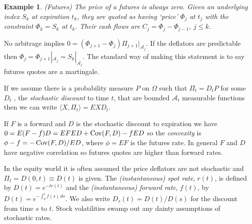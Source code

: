 \documentclass[fleqn]{amsart}
\renewcommand{\AA}{\mathcal{A}}
\newcommand{\Cov}{\mathop{\rm{Cov}}}
\providecommand{\pair}[1]{\langle#1\rangle}
\newtheorem{example}{Example}
\begin{document}
\begin{example}{(Futures)}
The price of a futures is always zero. Given an underlying index
\(S_k\) at expiration \(t_k\), they are quoted as having
`price' \(\Phi_j\) at \(t_j\) with the constraint
\(\Phi_k = S_k\) at \(t_k\).
Their cash flows are \(C_j = \Phi_j - \Phi_{j-1}\), \(j \le k\).
\end{example}
No arbitrage implies \(0 = (\Phi_{j+1} - \Phi_j)\Pi_{j+1}|_{\AA_j}\).
If the deflators are
predictable then \(\Phi_j = \Phi_{j+1}|_{\AA_j} = S_k|_{\AA_j}\). 
The standard way of making this statement is to say futures quotes are
a martingale. 

If we assume there is a probability measure \(P\)
on \(\Omega\) such that \(\Pi_t = D_tP\) for some \(D_t\)
, the {\em stochastic discount} to time \(t\),
that are bounded \(\AA_t\) measurable functions then we can
write \(\pair{X,\Pi_t} = EXD_t\).

If \(F\) is a forward and \(D\) is the stochastic discount to
expiration we have \(0 = E(F - f)D
= EF ED + \Cov(F,D) - f ED\) so the {\em convexity} is
\(\phi - f = -\Cov(F,D)/ED\), where \(\phi = EF\) is the
futures rate. In general \(F\) and \(D\) have negative
correlation so futures quotes are higher than forward rates.

In the equity world it is often assumed the price deflators
are not stochastic and \(\Pi_t = D(0,t) \equiv D(t)\) is given. 
The {\em (instantaneous) spot rate}, \(r(t)\), is defined
by \(D(t) = e^{-tr(t)}\) and the {\em (instantaneous)
forward rate}, \(f(t)\), by \(D(t) = e^{-\int_0^t f(s)\,ds}\).
We also write \(D_s(t) = D(t)/D(s)\) for the discount
from time \(s\) to \(t\).
Stock volatilities swamp
out any dainty assumptions of stochastic rates.
\end{document}
